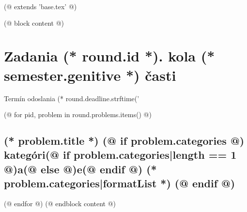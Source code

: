 (@ extends 'base.tex' @)

(@ block content @)
    

    \pagestyle{problems-(* competition.id *)-(* volume.id *)-(* semester.id *)-(* round.id *)}
    \thispagestyle{first-(* competition.id *)-(* volume.id *)-(* semester.id *)}
    \afterpage{\aftergroup\restoregeometry}%

    {
        \section{\texorpdfstring{Zadania (* round.id *). kola (* semester.genitive *) časti}{Zadania}}
        \centering
        \vspace*{-5mm}
        Termín odoslania (* round.deadline.strftime('%
    }

    (@ for pid, problem in round.problems.items() @)%
        \setcounter{volume}{(* volume.number *)}%
        \setcounter{semester}{(* semester.number *)}%
        \setcounter{round}{(* round.number *)}%
        \setcounter{problem}{(* problem.number *)}%

        \subsection{%
            \texorpdfstring{%
                \large \textbf{(* problem.title *)}%
                (@ if problem.categories @)%
                \normalsize \hfill kategóri(@ if problem.categories|length == 1 @)a(@ else @)e(@ endif @) (* problem.categories|formatList *)%
                (@ endif @)
            }{%
                (* round.number *).(* problem.number *) (* problem.title *)%
            }%
        }%
    (@ endfor @)
(@ endblock content @)
